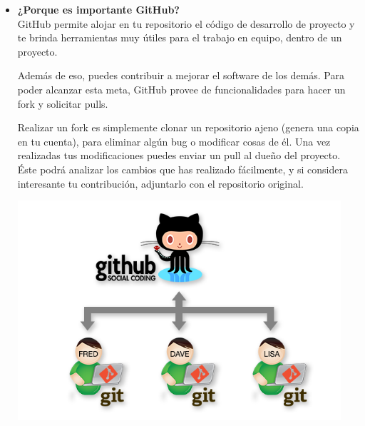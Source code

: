 \begin{itemize} %
\item \textbf{¿Porque es importante GitHub?}\\

GitHub permite alojar en tu repositorio el código de desarrollo de proyecto y te brinda herramientas muy útiles para el trabajo en equipo, dentro de un proyecto.

Además de eso, puedes contribuir a mejorar el software de los demás. Para poder alcanzar esta meta, GitHub provee de funcionalidades para hacer un fork y solicitar pulls.

Realizar un fork es simplemente clonar un repositorio ajeno (genera una copia en tu cuenta), para eliminar algún bug o modificar cosas de él. Una vez realizadas tus modificaciones puedes enviar un pull al dueño del proyecto. Éste podrá analizar los cambios que has realizado fácilmente, y si considera interesante tu contribución, adjuntarlo con el repositorio original.\\

\begin{center}
\includegraphics[width=12cm]{./Imagenes/actividad0402} 
\end{center}
	
\end{itemize} 
